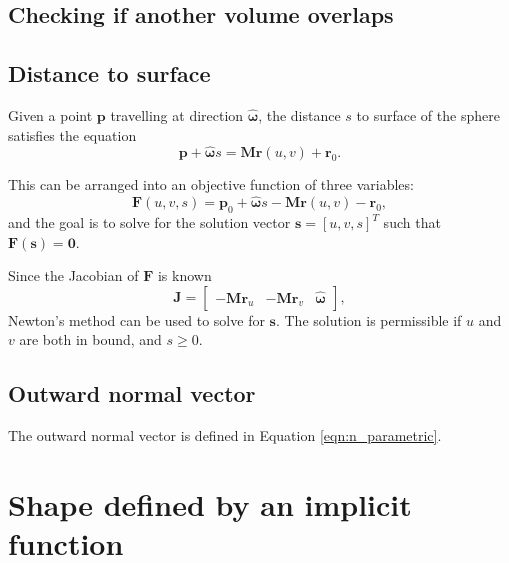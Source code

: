 \subsection{Checking if another volume overlaps}
\subsection{Distance to surface}
\label{sect:distance_to_parametric_surface}
Given a point $\bm{p}$ travelling at direction $\bm{\hat{\omega}}$, the distance $s$ to surface of the sphere satisfies the equation
$$
    \bm{p} + \bm{\hat{\omega}}s = \bm{M}\bm{r}(u,v) + \bm{r}_0.
$$

This can be arranged into an objective function of three variables:
\begin{equation}
    \bm{F}(u,v,s) = \bm{p}_0 + \bm{\hat{\omega}}s - \bm{M}\bm{r}(u,v) - \bm{r}_0,
\end{equation}
and the goal is to solve for the solution vector $\bm{s} = [u, v, s]^T$ such that $\bm{F}(\bm{s}) = \bm{0}$.

Since the Jacobian of $\bm{F}$ is known
\begin{equation}
    \bm{J} =
    \begin{bmatrix}
        -\bm{M}\bm{r}_u & -\bm{M}\bm{r}_v & \bm{\hat{\omega}}
    \end{bmatrix},
\end{equation}
Newton's method can be used to solve for $\bm{s}$. The solution is permissible if $u$ and $v$ are both in bound, and $s \geq 0$.

\subsection{Outward normal vector}
The outward normal vector is defined in Equation \ref{eqn:n_parametric}.

\section{Shape defined by an implicit function}